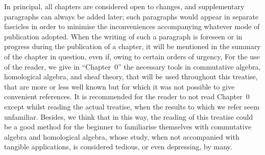 \bigskip

In principal, all chapters are considered open to changes, and supplementary
paragraphs can always be added later; such paragraphs would appear in separate
fascicles in order to minimise the inconveniences accompanying whatever mode of
publication adopted. When the writing of such a paragraph is foreseen or in
progress during the publication of a chapter, it will be mentioned in the
summary of the chapter in question, even if, owing to certain orders of urgency,
 For the use of
the reader, we give in ``Chapter~0'' the necessary tools in commutative algebra,
homological algebra, and sheaf theory, that will be used throughout this
treatise, that are more or less well known but for which it was not possible to
give convenient references. It is recommended for the reader to not read
Chapter~0 except whilst reading the actual treatise, when the results to which
we refer
seem unfamiliar. Besides, we think that in this way, the
reading of this treatise could be a good method for the beginner to familiarise
themselves with commutative algebra and homological algebra, whose study, when
not accompanied with tangible applications, is considered tedious, or even
depressing, by many.

\sectionbreak

